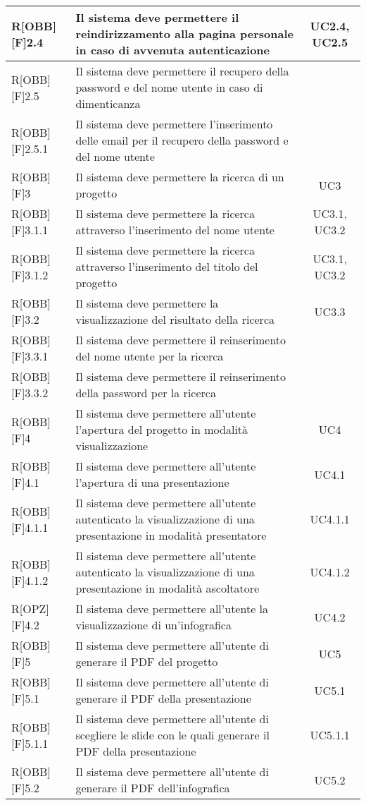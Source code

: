 \begin{center}
\begin{table}[h]
\begin{tabular}{|l|p{}|c|}
		R[OBB][F]2.4 & Il sistema deve permettere il reindirizzamento alla pagina personale in caso di avvenuta autenticazione & UC2.4, UC2.5 \\ \midrule
		R[OBB][F]2.5 & Il sistema deve permettere il recupero della password e del nome utente in caso di dimenticanza & \\ \midrule
		R[OBB][F]2.5.1 & Il sistema deve permettere l'inserimento delle email per il recupero della password e del nome utente & \\ \midrule
		
		R[OBB][F]3 & Il sistema deve permettere la ricerca di un progetto  & UC3 \\ \midrule
		R[OBB][F]3.1.1 & Il sistema deve permettere la ricerca attraverso l'inserimento del nome utente & UC3.1, UC3.2 \\ \midrule
		R[OBB][F]3.1.2 & Il sistema deve permettere la ricerca attraverso l'inserimento del titolo del progetto & UC3.1, UC3.2 \\ \midrule
		R[OBB][F]3.2 & Il sistema deve permettere la visualizzazione del risultato della ricerca & UC3.3 \\ \midrule
		R[OBB][F]3.3.1 & Il sistema deve permettere il reinserimento del nome utente per la ricerca &  \\ \midrule
		R[OBB][F]3.3.2 & Il sistema deve permettere il reinserimento della password per la ricerca &  \\ \midrule
		
		R[OBB][F]4 & Il sistema deve permettere all'utente l'apertura del progetto in modalità visualizzazione & UC4 \\ \midrule
		R[OBB][F]4.1 & Il sistema deve permettere all'utente l'apertura di una presentazione & UC4.1 \\ \midrule
		R[OBB][F]4.1.1 & Il sistema deve permettere all'utente autenticato la visualizzazione di una presentazione in modalità presentatore & UC4.1.1 \\ \midrule
		R[OBB][F]4.1.2 & Il sistema deve permettere all'utente autenticato la visualizzazione di una presentazione in modalità ascoltatore & UC4.1.2 \\ \midrule
		R[OPZ][F]4.2 & Il sistema deve permettere all'utente la visualizzazione di un'infografica & UC4.2 \\ \midrule
		
		R[OBB][F]5 & Il sistema deve permettere all'utente di generare il PDF del progetto & UC5 \\ \midrule
		R[OBB][F]5.1 & Il sistema deve permettere all'utente di generare il PDF della presentazione & UC5.1 \\ \midrule
		R[OBB][F]5.1.1 & Il sistema deve permettere all'utente di scegliere le slide con le quali generare il PDF della presentazione & UC5.1.1 \\ \midrule
		R[OBB][F]5.2 & Il sistema deve permettere all'utente di generare il PDF dell'infografica & UC5.2 \\ \midrule
		

\end{tabular}
\end{table}
\end{center}
